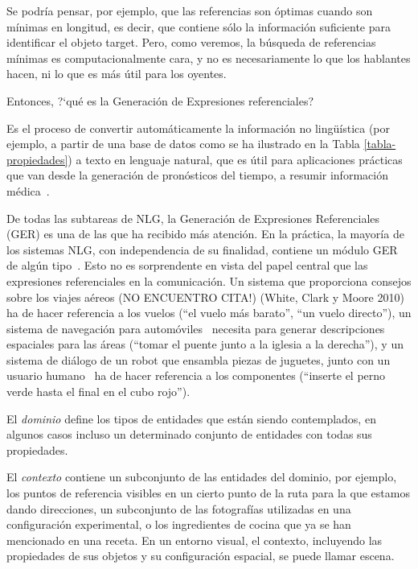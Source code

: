 Se podr\'{i}a pensar, por ejemplo, que las referencias son \'optimas cuando son m\'{i}nimas en longitud, es decir, 
que contiene s\'olo la informaci\'on suficiente para identificar el objeto target. Pero, como veremos, la b\'usqueda de referencias m\'{i}nimas
es computacionalmente cara, y no es necesariamente lo que los hablantes hacen, ni lo que es m\'as \'util para los oyentes.


Entonces,  ?`qu\'e es la Generaci\'on de Expresiones referenciales? 

Es el proceso de convertir autom\'aticamente la informaci\'on no ling\"u\'{i}stica (por ejemplo, a partir de una base de datos como se ha ilustrado en la Tabla \ref{tabla-propiedades}) a texto en lenguaje natural, que es \'util para aplicaciones pr\'acticas que van desde la generaci\'on de pron\'osticos del tiempo, a resumir informaci\'on m\'edica~\cite{dale2000}.

De todas las subtareas de NLG, la Generaci\'on de Expresiones Referenciales (GER) es
una de las que ha recibido m\'as atenci\'on. En la pr\'actica, la mayor\'ia de los
sistemas NLG, con independencia de su finalidad, contiene un m\'odulo GER de alg\'un tipo~\cite{Mellish2004}. Esto no es sorprendente
en vista del papel central que las expresiones referenciales en la comunicaci\'on. Un sistema que proporciona
consejos sobre los viajes a\'ereos (NO ENCUENTRO CITA!) (White, Clark y Moore 2010) ha de hacer referencia a los vuelos (``el
vuelo m\'as barato'', ``un vuelo directo''), un sistema de navegaci\'on para autom\'oviles~\cite{Drager:2012:GLN:2380816.2380908}
necesita para generar descripciones espaciales para las \'areas (``tomar el puente junto a la iglesia a la derecha''),
y un sistema de di\'alogo de un robot que ensambla piezas de juguetes, junto con un usuario humano~\cite{foster-etal-ijcai2009} ha de hacer referencia a los componentes (``inserte el perno verde hasta el final en el cubo rojo'').

El {\it dominio} define los tipos de entidades que est\'an siendo contemplados, en algunos
casos incluso un determinado conjunto de entidades con todas sus propiedades.

El {\it contexto} contiene un subconjunto de las entidades del dominio, por ejemplo, los puntos de referencia visibles en un cierto punto de la ruta para la que estamos dando direcciones, un subconjunto de las fotograf\'ias utilizadas en una configuraci\'on experimental, o los ingredientes de cocina que ya se han mencionado en una receta. En un entorno visual, el contexto, incluyendo las
propiedades de sus objetos y su configuraci\'on espacial, se puede llamar escena. 

